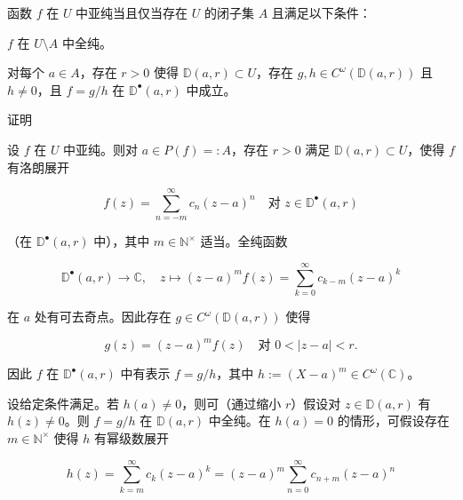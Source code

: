 \begin{proposition}

函数 $ f $ 在 $ U $ 中亚纯当且仅当存在 $ U $ 的闭子集 $ A $ 且满足以下条件：

\begin{subitems}
\item

$ f $ 在 $ U\setminus A $ 中全纯。

\item

对每个 $ a \in A $，存在 $ r > 0 $ 使得 $ \mathbb{D}(a,r) \subset U $，存在 $ g, h \in C^{\omega}\left(\mathbb{D}(a,r)\right) $ 且 $ h \ne 0 $，且 $ f = g/h $ 在 $ \mathbb{D}^{\bullet}(a,r) $ 中成立。

\end{subitems}

证明

\begin{items}
\item

设 $ f $ 在 $ U $ 中亚纯。则对 $ a \in P(f) =: A $，存在 $ r > 0 $ 满足 $ \mathbb{D}(a,r) \subset U $，使得 $ f $ 有洛朗展开

\[
f(z) = \sum_{n=-m}^{\infty}c_{n}(z - a)^{n} \quad \text{对 } z \in \mathbb{D}^{\bullet}(a,r)
\]

（在 $ \mathbb{D}^{\bullet}(a,r) $ 中），其中 $ m \in \mathbb{N}^{\times} $ 适当。全纯函数

\begin{equation}
\mathbb{D}^{\bullet}(a,r) \to \mathbb{C} , \quad z \mapsto (z - a)^{m}f(z) = \sum_{k=0}^{\infty}c_{k-m}(z - a)^{k}\tag{6.7}
\end{equation}

在 $ a $ 处有可去奇点。因此存在 $ g \in C^{\omega}\left(\mathbb{D}(a,r)\right) $ 使得

\[
g(z) = (z - a)^{m}f(z) \quad \text{对 } 0 < |z - a| < r .
\]

因此 $ f $ 在 $ \mathbb{D}^{\bullet}(a,r) $ 中有表示 $ f = g/h $，其中 $ h := (X - a)^{m} \in C^{\omega}(\mathbb{C}) $。

\item

设给定条件满足。若 $ h(a) \ne 0 $，则可（通过缩小 $ r $）假设对 $ z \in \mathbb{D}(a,r) $ 有 $ h(z) \ne 0 $。则 $ f = g/h $ 在 $ \mathbb{D}(a,r) $ 中全纯。在 $ h(a) = 0 $ 的情形，可假设存在 $ m \in \mathbb{N}^{\times} $ 使得 $ h $ 有幂级数展开

\[
h(z) = \sum_{k=m}^{\infty}c_{k}(z - a)^{k} = (z - a)^{m}\sum_{n=0}^{\infty}c_{n+m}(z - a)^{n}
\]


\end{items}
\end{proposition}
